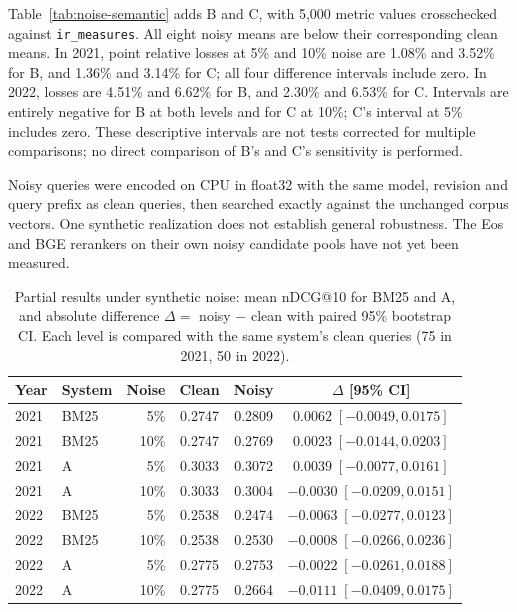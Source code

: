 \documentclass{article}
\begin{document}
Table~\ref{tab:noise-semantic} adds B and C, with 5{,}000 metric values crosschecked against \texttt{ir\_measures}. All eight noisy means are below their corresponding clean means. In 2021, point relative losses at 5\% and 10\% noise are 1.08\% and 3.52\% for B, and 1.36\% and 3.14\% for C; all four difference intervals include zero. In 2022, losses are 4.51\% and 6.62\% for B, and 2.30\% and 6.53\% for C. Intervals are entirely negative for B at both levels and for C at 10\%; C's interval at 5\% includes zero. These descriptive intervals are not tests corrected for multiple comparisons; no direct comparison of B's and C's sensitivity is performed.

Noisy queries were encoded on CPU in float32 with the same model, revision and query prefix as clean queries, then searched exactly against the unchanged corpus vectors. One synthetic realization does not establish general robustness. The Eos and BGE rerankers on their own noisy candidate pools have not yet been measured.

\begin{table}[t]
  \caption{Partial results under synthetic noise: mean nDCG@10 for BM25 and A, and absolute difference $\Delta =$ noisy $-$ clean with paired 95\% bootstrap CI. Each level is compared with the same system's clean queries (75 in 2021, 50 in 2022).}
  \label{tab:noise-partial}
  \centering
  \small
  \begin{tabular}{llrccc}
    \toprule
    Year & System & Noise & Clean & Noisy & $\Delta$ [95\% CI] \\
    \midrule
    2021 & BM25 & 5\% & 0.2747 & 0.2809 & $0.0062\;[-0.0049, 0.0175]$ \\
    2021 & BM25 & 10\% & 0.2747 & 0.2769 & $0.0023\;[-0.0144, 0.0203]$ \\
    2021 & A & 5\% & 0.3033 & 0.3072 & $0.0039\;[-0.0077, 0.0161]$ \\
    2021 & A & 10\% & 0.3033 & 0.3004 & $-0.0030\;[-0.0209, 0.0151]$ \\
    \midrule
    2022 & BM25 & 5\% & 0.2538 & 0.2474 & $-0.0063\;[-0.0277, 0.0123]$ \\
    2022 & BM25 & 10\% & 0.2538 & 0.2530 & $-0.0008\;[-0.0266, 0.0236]$ \\
    2022 & A & 5\% & 0.2775 & 0.2753 & $-0.0022\;[-0.0261, 0.0188]$ \\
    2022 & A & 10\% & 0.2775 & 0.2664 & $-0.0111\;[-0.0409, 0.0175]$ \\
    \bottomrule
  \end{tabular}
\end{table}
\end{document}
